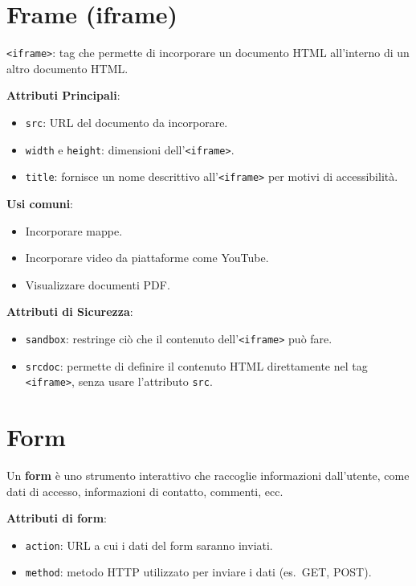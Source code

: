 \section{Frame (iframe)}

\texttt{<iframe>}: tag che permette di incorporare un documento HTML all'interno di un altro documento HTML.

\textbf{Attributi Principali}:
\begin{itemize}
    \item \texttt{src}: URL del documento da incorporare.
    \item \texttt{width} e \texttt{height}: dimensioni dell'\texttt{<iframe>}.
    \item \texttt{title}: fornisce un nome descrittivo all'\texttt{<iframe>} per motivi di accessibilità.
\end{itemize}

\textbf{Usi comuni}:
\begin{itemize}
    \item Incorporare mappe.
    \item Incorporare video da piattaforme come YouTube.
    \item Visualizzare documenti PDF.
\end{itemize}

\textbf{Attributi di Sicurezza}:
\begin{itemize}
    \item \texttt{sandbox}: restringe ciò che il contenuto dell'\texttt{<iframe>} può fare.
    \item \texttt{srcdoc}: permette di definire il contenuto HTML direttamente nel tag \texttt{<iframe>}, senza usare l'attributo \texttt{src}.
\end{itemize}

\section{Form}

Un \textbf{form} è uno strumento interattivo che raccoglie informazioni dall'utente, come dati di accesso, informazioni di contatto, commenti, ecc.

\textbf{Attributi di form}:
\begin{itemize}
    \item \texttt{action}: URL a cui i dati del form saranno inviati.
    \item \texttt{method}: metodo HTTP utilizzato per inviare i dati (es.\ GET, POST).
\end{itemize}

